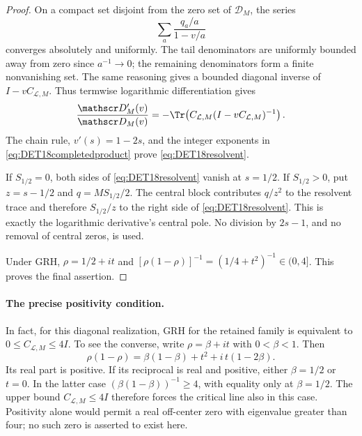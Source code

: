 \begin{proof}
On a compact set disjoint from the zero set of $\mathscr D_M$,
the series
\[
 \sum_a \frac{q_a/a}{1-v/a}
\]
converges absolutely and uniformly. The tail denominators are
uniformly bounded away from zero since $a^{-1}\to0$; the remaining
denominators form a finite nonvanishing set. The same reasoning
gives a bounded diagonal inverse of $I-vC_{\mathcal L,M}$.
Thus termwise logarithmic differentiation gives
\[
 \frac{\mathscr D_M'(v)}{\mathscr D_M(v)}
 =-\Tr\!\left(C_{\mathcal L,M}(I-vC_{\mathcal L,M})^{-1}\right).
\]
The chain rule, $v'(s)=1-2s$, and the integer exponents in
\eqref{eq:DET18completedproduct} prove
\eqref{eq:DET18resolvent}.

If $S_{1/2}=0$, both sides of \eqref{eq:DET18resolvent} vanish at
$s=1/2$. If $S_{1/2}>0$, put $z=s-1/2$ and
$q=MS_{1/2}/2$. The central block contributes $q/z^2$ to the
resolvent trace and therefore $S_{1/2}/z$ to the right side of
\eqref{eq:DET18resolvent}. This is exactly the logarithmic
derivative's central pole. No division by $2s-1$, and no removal
of central zeros, is used.

Under GRH, $\rho=1/2+it$ and
$[\rho(1-\rho)]^{-1}=(1/4+t^2)^{-1}\in(0,4]$.
This proves the final assertion.
\end{proof}

\paragraph{The precise positivity condition.}
In fact, for this diagonal realization, GRH for the retained family
is equivalent to $0\le C_{\mathcal L,M}\le4I$.
To see the converse, write $\rho=\beta+it$ with $0<\beta<1$.
Then
\[
 \rho(1-\rho)=\beta(1-\beta)+t^2+i\,t(1-2\beta).
\]
Its real part is positive. If its reciprocal is real and positive,
either $\beta=1/2$ or $t=0$. In the latter case
$(\beta(1-\beta))^{-1}\ge4$, with equality only at $\beta=1/2$.
The upper bound $C_{\mathcal L,M}\le4I$ therefore forces the
critical line also in this case. Positivity alone would permit a
real off-center zero with eigenvalue greater than four; no such zero
is asserted to exist here.

